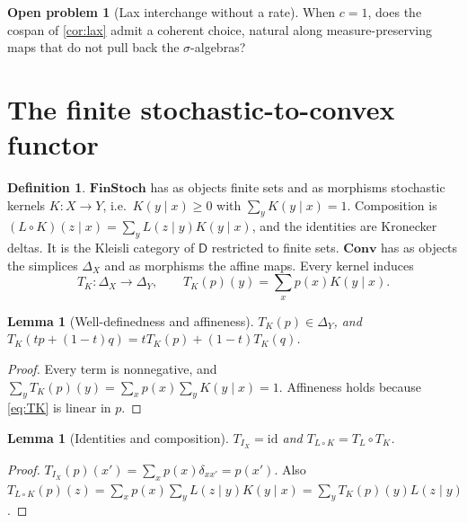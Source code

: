 \documentclass[11pt]{article}
\newtheorem{lemma}[theorem]{Lemma}
\theoremstyle{definition}
\newtheorem{definition}[theorem]{Definition}
\newtheorem{problem}[theorem]{Open problem}
\newcommand{\D}{\mathsf D}
\newcommand{\id}{\mathrm{id}}
\begin{document}
\begin{problem}[Lax interchange without a rate]\label{op:general}
When $c=1$, does the cospan of \cref{cor:lax} admit a coherent choice, natural along measure-preserving maps that do not pull back the
$\sigma$-algebras?
\end{problem}

\section{The finite stochastic-to-convex functor}\label{sec:convex}

\begin{definition}
$\mathbf{FinStoch}$ has as objects finite sets and as morphisms stochastic kernels $K\colon X\to Y$, i.e.\ $K(y\mid x)\ge0$ with
$\sum_yK(y\mid x)=1$. Composition is $(L\circ K)(z\mid x)=\sum_yL(z\mid y)K(y\mid x)$, and the identities are Kronecker deltas. It is
the Kleisli category of $\D$ restricted to finite sets. $\mathbf{Conv}$ has as objects the simplices $\Delta_X$ and as morphisms the
affine maps. Every kernel induces
\begin{equation}\label{eq:TK}
T_K\colon\Delta_X\to\Delta_Y,\qquad T_K(p)(y)=\sum_xp(x)K(y\mid x).
\end{equation}
\end{definition}

\begin{lemma}[Well-definedness and affineness]\label{lem:TK}
$T_K(p)\in\Delta_Y$, and $T_K(tp+(1-t)q)=tT_K(p)+(1-t)T_K(q)$.
\end{lemma}
\begin{proof}
Every term is nonnegative, and $\sum_yT_K(p)(y)=\sum_xp(x)\sum_yK(y\mid x)=1$. Affineness holds because \eqref{eq:TK} is linear in
$p$.
\end{proof}

\begin{lemma}[Identities and composition]\label{lem:TKcomp}
$T_{I_X}=\id$ and $T_{L\circ K}=T_L\circ T_K$.
\end{lemma}
\begin{proof}
$T_{I_X}(p)(x')=\sum_xp(x)\delta_{xx'}=p(x')$. Also
$T_{L\circ K}(p)(z)=\sum_xp(x)\sum_yL(z\mid y)K(y\mid x)=\sum_yT_K(p)(y)L(z\mid y)$.
\end{proof}
\end{document}
